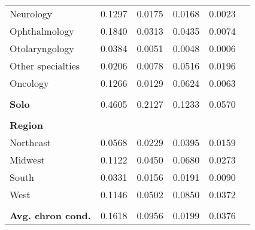 \documentclass[12pt]{report}
\begin{document}
{\begin{center}
\begin{longtable}{lccccc}
Neurology                              & 0.1297                   & 0.0175              & 0.0168                    & 0.0023               \\
Ophthalmology                          & 0.1840                   & 0.0313              & 0.0435                    & 0.0074               \\
Otolaryngology                         & 0.0384                   & 0.0051              & 0.0048                    & 0.0006               \\
Other specialties                      & 0.0206                   & 0.0078              & 0.0516                    & 0.0196               \\
Oncology                               & 0.1266                   & 0.0129              & 0.0624                    & 0.0063               \\
                                       &                          &                     &                           &                      \\
\textbf{Solo}                                   & 0.4605                   & 0.2127              & 0.1233                    & 0.0570               \\
                                       &                          &                     &                           &                      \\
\textbf{Region}                        &                          &                     &                           &                      \\
Northeast                              & 0.0568                   & 0.0229              & 0.0395                    & 0.0159               \\
Midwest                                & 0.1122                   & 0.0450              & 0.0680                    & 0.0273               \\
South                                  & 0.0331                   & 0.0156              & 0.0191                    & 0.0090               \\
West                                   & 0.1146                   & 0.0502              & 0.0850                    & 0.0372               \\
                                       &                          &                     &                           &                      \\
\textbf{Avg. chron cond.}              & 0.1618                   & 0.0956              & 0.0199                    & 0.0376               \\

\end{longtable}
\end{center}}
\end{document}
